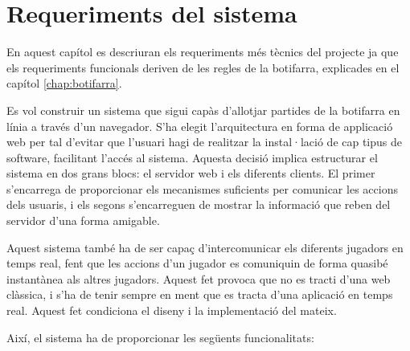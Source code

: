 

\chapter{Requeriments del sistema}
\label{chap:requeriments}

En aquest capítol es descriuran els requeriments més tècnics del projecte ja que els requeriments funcionals  deriven de les regles  de la botifarra, explicades en el capítol \ref{chap:botifarra}.

Es vol construir un sistema que sigui capàs d'allotjar partides de la botifarra en línia a través d'un navegador. S'ha elegit l'arquitectura en forma de applicació web per tal d'evitar que l'usuari hagi de realitzar la instal·lació de cap tipus de software, facilitant l'accés al sistema. Aquesta decisió implica estructurar el sistema en dos grans blocs: el servidor web i els diferents clients. El primer s'encarrega de proporcionar els mecanismes suficients per comunicar les accions dels usuaris, i els segons s'encarreguen de mostrar la informació que reben del servidor d'una forma amigable.

Aquest sistema també ha de ser capaç d'intercomunicar els diferents jugadors en temps real, fent que les accions d'un jugador es comuniquin de forma quasibé instantànea als altres jugadors. Aquest fet provoca que no es tracti d'una web clàssica, i s'ha de tenir sempre en ment que es tracta d'una aplicació en temps real. Aquest fet condiciona el diseny i la implementació del mateix. 

Així, el sistema ha de proporcionar les següents funcionalitats: 

